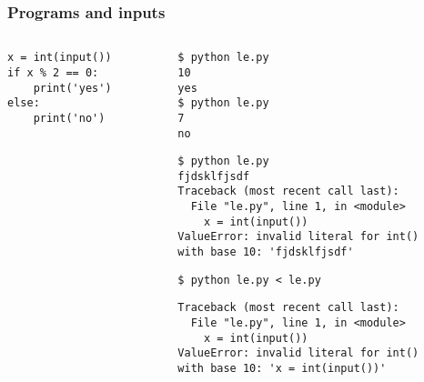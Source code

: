 \begin{frame}[fragile=true]
  \frametitle{Programs and inputs}
  \begin{columns}
    \begin{column}{0.5\textwidth}
\begin{verbatim}
x = int(input())
if x % 2 == 0:
    print('yes')
else:
    print('no')
\end{verbatim}
    \end{column}
    \pause
    \begin{column}{0.5\textwidth}
      {\small
\begin{verbatim}
$ python le.py 
10
yes
$ python le.py 
7
no
\end{verbatim}
\pause
\begin{verbatim}
$ python le.py 
fjdsklfjsdf
Traceback (most recent call last):
  File "le.py", line 1, in <module>
    x = int(input())
ValueError: invalid literal for int()
with base 10: 'fjdsklfjsdf'
\end{verbatim}
\pause
\begin{verbatim}
$ python le.py < le.py
\end{verbatim}
\pause
\begin{verbatim}
Traceback (most recent call last):
  File "le.py", line 1, in <module>
    x = int(input())
ValueError: invalid literal for int()
with base 10: 'x = int(input())'
\end{verbatim}
      }
    \end{column}
  \end{columns}
\end{frame}

